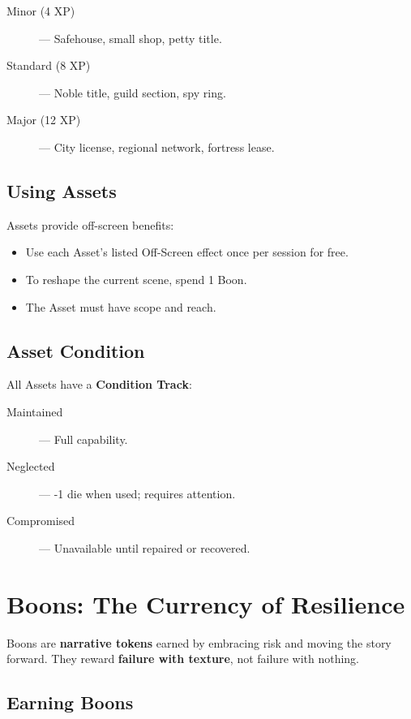 \begin{description}
    \item[Minor (4 XP)] --- Safehouse, small shop, petty title.
    \item[Standard (8 XP)] --- Noble title, guild section, spy ring.
    \item[Major (12 XP)] --- City license, regional network, fortress lease.
\end{description}

\subsection*{Using Assets}

Assets provide off-screen benefits:

\begin{itemize}
    \item Use each Asset's listed Off-Screen effect once per session for free.
    \item To reshape the current scene, spend 1 Boon.
    \item The Asset must have scope and reach.
\end{itemize}

\subsection*{Asset Condition}

All Assets have a \textbf{Condition Track}:

\begin{description}
    \item[Maintained] --- Full capability.
    \item[Neglected] --- -1 die when used; requires attention.
    \item[Compromised] --- Unavailable until repaired or recovered.
\end{description}

\section*{Boons: The Currency of Resilience}

Boons are \textbf{narrative tokens} earned by embracing risk and moving the story forward. They reward \textbf{failure with texture}, not failure with nothing.

\subsection*{Earning Boons}

